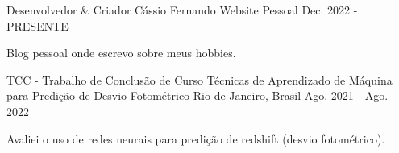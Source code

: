 

\begin{cventries}

  \cventry
    {Desenvolvedor \& Criador} %
    {Cássio Fernando} %
    {Website Pessoal} %
    {Dec. 2022 - PRESENTE} %
    {
      \begin{cvitems} %
        \item {Blog pessoal onde escrevo sobre meus hobbies.}
      \end{cvitems}
    }

  \cventry
    {TCC - Trabalho de Conclusão de Curso} %
    {Técnicas de Aprendizado de Máquina para Predição de Desvio Fotométrico} %
    {Rio de Janeiro, Brasil} %
    {Ago. 2021 - Ago. 2022} %
    {
      \begin{cvitems} %
        \item {Avaliei o uso de redes neurais para predição de redshift (desvio fotométrico).}
      \end{cvitems}
    }

\end{cventries}
